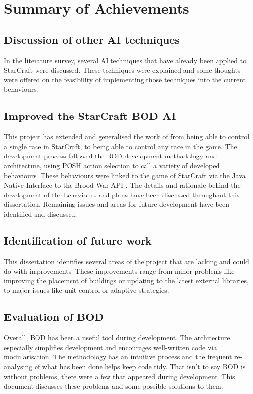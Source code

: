 \documentclass[11pt,openright,a4paper]{report}
\begin{document}
\section{Summary of Achievements}

\subsection{Discussion of other AI techniques}
In the literature survey, several AI techniques that have already been applied to StarCraft were discussed. These techniques were explained and some thoughts were offered on the feasibility of implementing those techniques into the current behaviours.

\subsection{Improved the StarCraft BOD AI}
This project has extended and generalised the work of  from being able to control a single race in StarCraft, to being able to control any race in the game. The development process followed the BOD development methodology and architecture, using POSH action selection to call a variety of developed behaviours. These behaviours were linked to the game of StarCraft via the Java Native Interface to the  Brood War API \cite{JNIBWAPI}. The details and rationale behind the development of the behaviours and plans have been discussed throughout this dissertation. Remaining issues and areas for future development have been identified and discussed.

\subsection{Identification of future work}
This dissertation identifies several areas of the project that are lacking and could do with improvements. These improvements range from minor problems like improving the placement of buildings or updating to the latest external libraries, to major issues like unit control or adaptive strategies.

\subsection{Evaluation of BOD}
Overall, BOD has been a useful tool during development. The architecture especially simplifies development and encourages well-written code via modularisation. The methodology has an intuitive process and the frequent re-analysing of what has been done helps keep code tidy. That isn't to say BOD is without problems, there were a few that appeared during development. This document discusses these problems and some possible solutions to them.
\end{document}
